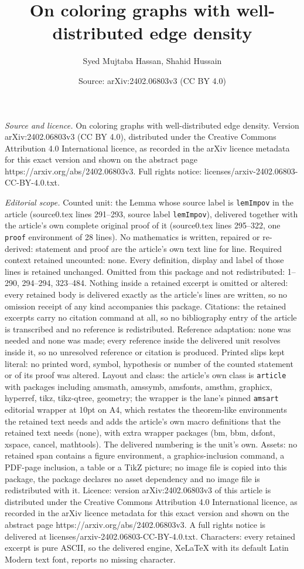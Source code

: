 \documentclass[10pt,a4paper]{amsart}
\title[On coloring graphs with well-distributed edge density]{On coloring graphs with well-distributed edge density}
\author{Syed Mujtaba Hassan, Shahid Hussain}
\date{Source: arXiv:2402.06803v3 (CC BY 4.0)}
\begin{document}
\maketitle

\noindent\emph{Source and licence.} On coloring graphs with well-distributed edge density. Version arXiv:2402.06803v3 (CC BY 4.0), distributed under the Creative Commons Attribution 4.0 International licence, as recorded in the arXiv licence metadata for this exact version and shown on the abstract page https://arxiv.org/abs/2402.06803v3. Full rights notice: licenses/arxiv-2402.06803-CC-BY-4.0.txt.\par\smallskip

\noindent\textit{Editorial scope.} Counted unit: the Lemma whose source label is \texttt{lemImpov} in the article (source0.tex lines 291--293, source label \texttt{lemImpov}), delivered together with the article's own complete original proof of it (source0.tex lines 295--322, one \texttt{proof} environment of 28 lines). No mathematics is written, repaired or re-derived: statement and proof are the article's own text line for line. Required context retained uncounted: none. Every definition, display and label of those lines is retained unchanged. Omitted from this package and not redistributed: 1--290, 294--294, 323--484. Nothing inside a retained excerpt is omitted or altered: every retained body is delivered exactly as the article's lines are written, so no omission receipt of any kind accompanies this package. Citations: the retained excerpts carry no citation command at all, so no bibliography entry of the article is transcribed and no reference is redistributed. Reference adaptation: none was needed and none was made; every reference inside the delivered unit resolves inside it, so no unresolved reference or citation is produced. Printed slips kept literal: no printed word, symbol, hypothesis or number of the counted statement or of its proof was altered. Layout and class: the article's own class is \texttt{article} with packages including amsmath, amssymb, amsfonts, amsthm, graphicx, hyperref, tikz, tikz-qtree, geometry; the wrapper is the lane's pinned \texttt{amsart} editorial wrapper at 10pt on A4, which restates the theorem-like environments the retained text needs and adds the article's own macro definitions that the retained text needs (none), with extra wrapper packages (bm, bbm, dsfont, xspace, cancel, mathtools). The delivered numbering is the unit's own. Assets: no retained span contains a figure environment, a graphics-inclusion command, a PDF-page inclusion, a table or a TikZ picture; no image file is copied into this package, the package declares no asset dependency and no image file is redistributed with it. Licence: version arXiv:2402.06803v3 of this article is distributed under the Creative Commons Attribution 4.0 International licence, as recorded in the arXiv licence metadata for this exact version and shown on the abstract page https://arxiv.org/abs/2402.06803v3. A full rights notice is delivered at licenses/arxiv-2402.06803-CC-BY-4.0.txt. Characters: every retained excerpt is pure ASCII, so the delivered engine, XeLaTeX with its default Latin Modern text font, reports no missing character.
\end{document}
